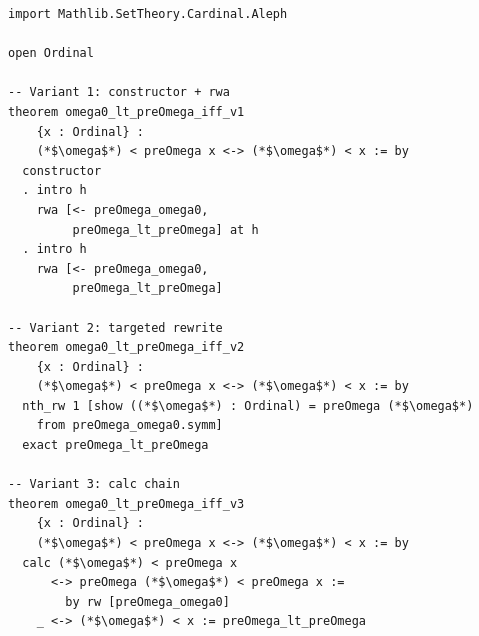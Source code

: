 \documentclass[11pt]{article}
\theoremstyle{definition}
\theoremstyle{remark}
\begin{document}
\begin{lstlisting}
import Mathlib.SetTheory.Cardinal.Aleph

open Ordinal

-- Variant 1: constructor + rwa
theorem omega0_lt_preOmega_iff_v1
    {x : Ordinal} :
    (*$\omega$*) < preOmega x <-> (*$\omega$*) < x := by
  constructor
  . intro h
    rwa [<- preOmega_omega0,
         preOmega_lt_preOmega] at h
  . intro h
    rwa [<- preOmega_omega0,
         preOmega_lt_preOmega]

-- Variant 2: targeted rewrite
theorem omega0_lt_preOmega_iff_v2
    {x : Ordinal} :
    (*$\omega$*) < preOmega x <-> (*$\omega$*) < x := by
  nth_rw 1 [show ((*$\omega$*) : Ordinal) = preOmega (*$\omega$*)
    from preOmega_omega0.symm]
  exact preOmega_lt_preOmega

-- Variant 3: calc chain
theorem omega0_lt_preOmega_iff_v3
    {x : Ordinal} :
    (*$\omega$*) < preOmega x <-> (*$\omega$*) < x := by
  calc (*$\omega$*) < preOmega x
      <-> preOmega (*$\omega$*) < preOmega x :=
        by rw [preOmega_omega0]
    _ <-> (*$\omega$*) < x := preOmega_lt_preOmega
\end{lstlisting}
\end{document}
